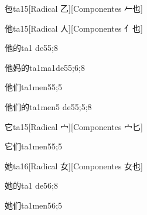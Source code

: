 
\begin{verbete}{㐌}{ta1}{5}[Radical 乙][Componentes 𠂉也]
\end{verbete}

\begin{verbete}{他}{ta1}{5}[Radical 人][Componentes 亻也]
\end{verbete}

\begin{verbete}{他的}{ta1 de5}{5;8}
\end{verbete}

\begin{verbete}{他妈的}{ta1ma1de5}{5;6;8}
\end{verbete}

\begin{verbete}{他们}{ta1men5}{5;5}
\end{verbete}

\begin{verbete}{他们的}{ta1men5 de5}{5;5;8}
\end{verbete}

\begin{verbete}{它}{ta1}{5}[Radical 宀][Componentes 宀匕]
\end{verbete}

\begin{verbete}{它们}{ta1men5}{5;5}
\end{verbete}

\begin{verbete}{她}{ta1}{6}[Radical 女][Componentes 女也]
\end{verbete}

\begin{verbete}{她的}{ta1 de5}{6;8}
\end{verbete}

\begin{verbete}{她们}{ta1men5}{6;5}
\end{verbete}

